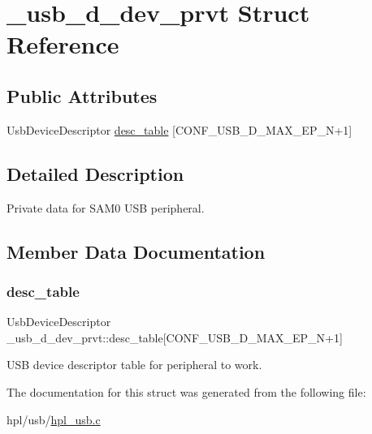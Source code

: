 \hypertarget{struct__usb__d__dev__prvt}{}\section{\+\_\+usb\+\_\+d\+\_\+dev\+\_\+prvt Struct Reference}
\label{struct__usb__d__dev__prvt}
\subsection*{Public Attributes}
\begin{DoxyCompactItemize}
\item 
Usb\+Device\+Descriptor \hyperlink{struct__usb__d__dev__prvt_a2ff153ebb67f5de495997629bcf911b2}{desc\+\_\+table} \mbox{[}C\+O\+N\+F\+\_\+\+U\+S\+B\+\_\+\+D\+\_\+\+M\+A\+X\+\_\+\+E\+P\+\_\+N+1\mbox{]}
\end{DoxyCompactItemize}


\subsection{Detailed Description}
Private data for S\+A\+M0 U\+SB peripheral. 

\subsection{Member Data Documentation}
\mbox{\label{struct__usb__d__dev__prvt_a2ff153ebb67f5de495997629bcf911b2}} 
\subsubsection{\texorpdfstring{desc\+\_\+table}{desc\_table}}
{\footnotesize\ttfamily Usb\+Device\+Descriptor \+\_\+usb\+\_\+d\+\_\+dev\+\_\+prvt\+::desc\+\_\+table\mbox{[}C\+O\+N\+F\+\_\+\+U\+S\+B\+\_\+\+D\+\_\+\+M\+A\+X\+\_\+\+E\+P\+\_\+N+1\mbox{]}}

U\+SB device descriptor table for peripheral to work. 

The documentation for this struct was generated from the following file\+:\begin{DoxyCompactItemize}
\item 
hpl/usb/\hyperlink{hpl__usb_8c}{hpl\+\_\+usb.\+c}\end{DoxyCompactItemize}
